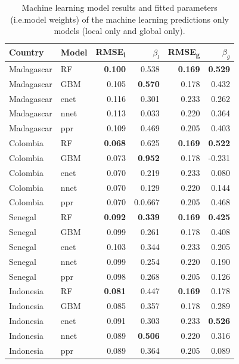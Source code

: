 \documentclass[11pt]{article}
\begin{document}
\begin{table}
\caption{Machine learning model results and fitted parameters (i.e.\thinspace model weights) of the machine learning predictions only models (local only and global only). }
\centering
\small
\begin{tabular}{ll|rr|rr}
     Country          & Model &      RMSE\textsubscript{l} & $\beta_l$ & RMSE\textsubscript{g} & $\beta_g$ \\ \hline
Madagascar & RF & \textbf{0.100} & 0.538 &  \textbf{0.169} & \textbf{0.529}\\
Madagascar & GBM & 0.105 & \textbf{0.570} & 0.178& 0.432 \\
Madagascar & enet & 0.116 & 0.301 &0.233 & 0.262 \\
Madagascar & nnet & 0.113 & 0.033 &0.220 & 0.364 \\
Madagascar & ppr & 0.109 & 0.469 & 0.205 &  0.403\vspace{0.3cm}\\ 
Colombia & RF & \textbf{0.068} & 0.625 &  \textbf{0.169} & \textbf{0.522}\\
Colombia & GBM & 0.073 & \textbf{0.952} & 0.178& -0.231  \\
Colombia & enet & 0.070 & 0.219 &0.233 & 0.080 \\
Colombia & nnet & 0.070 & 0.129 &0.220 & 0.144 \\
Colombia & ppr & 0.070 & 0.0.667 & 0.205 &  0.468\vspace{0.3cm}\\
Senegal & RF & \textbf{0.092} & \textbf{0.339} & \textbf{0.169} & \textbf{0.425} \\
Senegal & GBM & 0.099 & 0.261& 0.178& 0.408 \\
Senegal & enet& 0.103 & 0.344  &0.233 & 0.205 \\
Senegal & nnet & 0.099 & 0.254 &0.220 & 0.190 \\
Senegal & ppr & 0.098 & 0.268& 0.205 &  0.126\vspace{0.3cm}\\
Indonesia & RF& \textbf{0.081} & 0.447 & \textbf{0.169} & 0.178\\
Indonesia & GBM & 0.085 & 0.357 & 0.178& 0.289 \\
Indonesia & enet & 0.091 & 0.303 &0.233 & \textbf{0.526} \\
Indonesia & nnet & 0.089 & \textbf{0.506} &0.220 & 0.316 \\
Indonesia & ppr & 0.089 & 0.364 & 0.205 &  0.089\vspace{0.3cm}\\

\end{tabular}
\label{t:mlresults}
\end{table}
\end{document}
